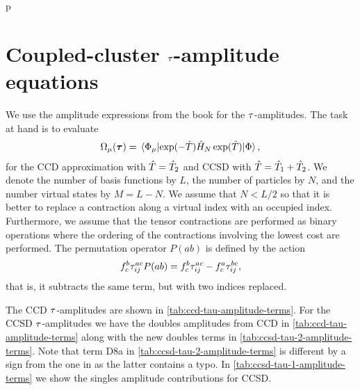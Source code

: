 p   \section{Coupled-cluster $\tau$-amplitude equations}
        \label{app:cc-tau-amplitudes}
        We use the amplitude expressions from the book
         \cite{shavitt2009many} for the
        $\tau$-amplitudes.
        The task at hand is to evaluate
        \begin{align}
            \Omega_{\mu}(\vfg{\clustamp})
            = \mel*{\slat_{\mu}}{
                \exponential(-\clust)
                \hamil_N
                \exponential(\clust)
            }{\slat},
        \end{align}
        for the CCD approximation with $\hat{T} = \hat{T}_2$ and CCSD with $\hat{T}
        = \hat{T}_1 + \hat{T}_2$.
        We denote the number of basis functions by $L$, the number of particles
        by $N$, and the number virtual states by $M = L - N$.
        We assume that $N < L / 2$ so that it is better to replace a contraction
        along a virtual index with an occupied index.
        Furthermore, we assume that the tensor contractions are performed as
        binary operations where the ordering of the contractions involving the
        lowest cost are performed.
        The permutation operator $P(ab)$ is defined by the action
        \begin{align}
            f^{b}_{c} \tau^{ac}_{ij} P(ab)
            =
            f^{b}_{c} \tau^{ac}_{ij}
            -
            f^{a}_{c} \tau^{bc}_{ij},
        \end{align}
        that is, it subtracts the same term, but with two indices replaced.

        The CCD $\tau$-amplitudes are shown in
        \autoref{tab:ccd-tau-amplitude-terms}.
        For the CCSD $\tau$-amplitudes we have the doubles amplitudes from
        CCD in \autoref{tab:ccd-tau-amplitude-terms} along with the new doubles
        terms in \autoref{tab:ccsd-tau-2-amplitude-terms}.
        Note that term D8a in \autoref{tab:ccsd-tau-2-amplitude-terms} is
        different by a sign from the one in  as the
        latter contains a typo.
        In \autoref{tab:ccsd-tau-1-amplitude-terms} we show the singles
        amplitude contributions for CCSD.

